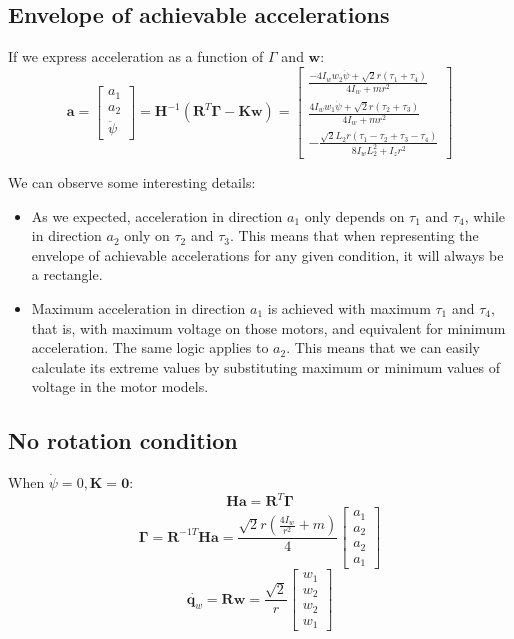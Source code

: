 \documentclass[12pt]{article}
\renewcommand{\vec}[1]{\bm{#1}}
\newcommand{\R}{\mathbb R}
\newcommand{\w}{\dot\varphi}
\def\R{\vec R}
\def\q{\vec q}
\begin{document}
\subsection*{Envelope of achievable accelerations}
If we express acceleration as a function of $\Gamma$ and $\vec w$:
$$ \vec a = \left[\begin{matrix}a_{1}\\a_{2}\\\ddot{\psi}\end{matrix}\right] = \vec H^{-1}(\R^T \vec \Gamma - \vec K \vec w) =  \left[\begin{matrix}\frac{- 4 I_{w} w_{2} \dot{\psi} + \sqrt{2} r \left(\tau_{1} + \tau_{4}\right)}{4 I_{w} + m r^{2}}\\\frac{4 I_{w} w_{1} \dot{\psi} + \sqrt{2} r \left(\tau_{2} + \tau_{3}\right)}{4 I_{w} + m r^{2}}\\- \frac{\sqrt{2} L_{2} r \left(\tau_{1} - \tau_{2} + \tau_{3} - \tau_{4}\right)}{8 I_{w} L_{2}^{2} + I_{z} r^{2}}\end{matrix}\right]$$

We can observe some interesting details:
\begin{itemize}
	\item As we expected, acceleration in direction $a_1$ only depends on $\tau_1$ and $\tau_4$, while in direction $a_2$ only on $\tau_2$ and $\tau_3$. This means that when representing the envelope of achievable accelerations for any given condition, it will always be a rectangle.
	\item Maximum acceleration in direction $a_1$ is achieved with maximum $\tau_1$ and $\tau_4$, that is, with maximum voltage on those motors, and equivalent for minimum acceleration. The same logic applies to $a_2$. This means that we can easily calculate its extreme values by substituting maximum or minimum values of voltage in the motor models.
\end{itemize}
\subsection*{No rotation condition}
When $\dot\psi = 0, \vec K =\vec 0$:
$$ \vec H\vec a = \R^T\vec \Gamma$$
$$\vec \Gamma = \R^{-1T}\vec H\vec a = \frac{\sqrt{2} r \left(\frac{4 I_{w}}{r^{2}} + m\right)}{4}\left[\begin{matrix}a_{1} \\a_{2} \\a_{2} \\a_{1} \end{matrix}\right]$$
$$\dot{\q_w} = \R \vec{w} = \frac{\sqrt{2}}{r} \left[\begin{matrix}w_1\\w_2\\w_2\\w_1\end{matrix}\right]$$
\end{document}
